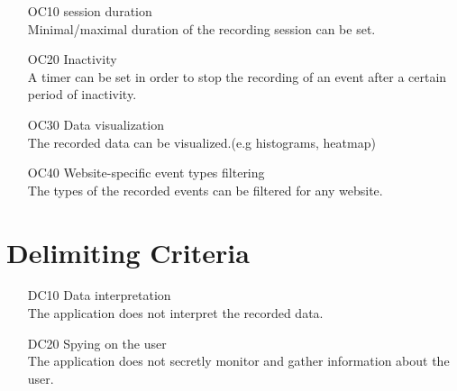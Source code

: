 \begin{itemize}

	\item[OC10]\Gls{session} duration\\Minimal/maximal duration of the recording \gls{session} can be set.
	\item[OC20]Inactivity\\A timer can be set in order to stop the recording of an \gls{event} after a certain period of inactivity.
	\item[OC30]Data visualization\\The recorded data can be visualized.(e.g histograms, heatmap)
	\item[OC40]Website-specific event types filtering\\The types of the recorded \glspl{event} can be filtered for any website.

\end{itemize}

\section{Delimiting Criteria}

\begin{itemize}

	\item[DC10]Data interpretation\\The application does not interpret the recorded data.
	\item[DC20]Spying on the \gls{user}\\The application does not secretly monitor and gather information about the \gls{user}.
	
\end{itemize}